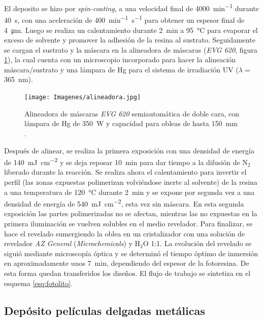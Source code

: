 		El deposito se hizo por \textit{spin-coating}, a una velocidad final de \SI{4000}{\minute^{-1}} durante \SI{40}{\second}, con una aceleración de \SI{400}{\minute^{-1}.\second^{-1}} para obtener un espesor final de \SI{4}{\um}. Luego se realiza un calentamiento durante \SI{2}{\minute} a \SI{95}{\celsius} para evaporar el exceso de solvente y promover la adhesión de la resina al sustrato. Seguidamente se cargan el sustrato y la máscara en la alineadora de máscaras (\textit{EVG 620}, figura \ref{fig:alineadora}), la cual cuenta con un microscopio incorporado para hacer la alineación máscara/sustrato y una lámpara de Hg para el sistema de irradiación UV ($\lambda=$\SI{365}{\nm}). 
			\begin{figure}[b!]
			  \begin{center}
			  \vspace*{-0.4cm}%
			  \texttt{[image: Imagenes/alineadora.jpg]}
			  \caption[Alineadora de máscaras]{Alineadora de máscaras \textit{EVG 620} semiautomática de doble cara, con lámpara de Hg de \SI{350}{W}  y capacidad para obleas de hasta \SI{150}{\mm} .}
			  \label{fig:alineadora}
			  \end{center}
			  \end{figure}	
			
		Después de alinear, se realiza la primera exposición con una densidad de energía de \SI{140}{mJ.\cm^{-2}} y se deja reposar \SI{10}{\minute} para dar tiempo a la difusión de N$_2$ liberado durante la reacción. Se realiza ahora el calentamiento para invertir el perfil (las zonas expuestas polimerizan volviéndose inerte al solvente) de la resina a una temperatura de \SI{120}{\celsius} durante \SI{2}{\minute}  y se expone por segunda vez a una densidad de energía de \SI{540}{mJ.cm^{-2}}, esta vez sin máscara. En esta segunda exposición las partes polimerizadas no se afectan, mientras las no expuestas en la primera iluminación se vuelven solubles en el medio revelador. Para finalizar, se hace el revelado sumergiendo la oblea en un cristalizador con una solución de revelador \textit{AZ General} (\textit{Microchemicals}) y H$_2$O 1:1. La evolución del revelado se siguió mediante microscopía óptica y se determinó el tiempo óptimo de inmersión en aproximadamente unos \SI{7}{\minute}, dependiendo del espesor de la fotoresina. De esta forma quedan transferidos los diseños. El flujo de trabajo se sintetiza en el esquema \ref{esq:fotolito}.
			 
	\subsection{Depósito películas delgadas metálicas}\label{sec:sputt}

